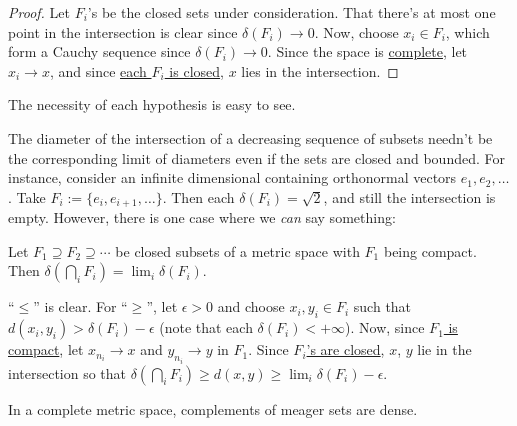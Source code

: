 	\begin{proof}
		Let $F_i$'s be the closed sets under consideration. That there's at most one point in the intersection is clear since \uline{$\delta(F_i)\to 0$}. Now, choose
		$x_i\in F_i$, which form a Cauchy sequence since \uline{$\delta(F_i)\to 0$}. Since the space is \uline{complete}, let $x_i\to x$, and since \uline{each $F_i$ is closed}, $x$ lies in the intersection.
	\end{proof}
	
	\begin{rmk}
		The necessity of each hypothesis is easy to see.
	\end{rmk}
	
	\begin{dgrs}
		The diameter of the intersection of a decreasing sequence of subsets needn't be the corresponding limit of diameters even if the sets are closed and bounded. For instance, consider an infinite dimensional \NLS containing orthonormal vectors $e_1, e_2, \ldots$. Take $F_i := \{e_i, e_{i + 1}, \ldots\}$. Then each $\delta(F_i) = \sqrt 2$, and still the intersection is empty. However, there is one case where we \emph{can} say something:
		
		\begin{prp}
			Let $F_1\supseteq F_2\supseteq\cdots$ be closed subsets of a metric space with $F_1$ being compact. Then $\delta(\bigcap_i F_i) = \lim_i\delta(F_i)$.
		\end{prp}
		
		\begin{dgrsProof}
			``$\le$'' is clear. For ``$\ge$'', let $\epsilon> 0$ and choose $x_i, y_i\in F_i$ such that $d(x_i, y_i) > \delta(F_i) - \epsilon$ (note that each $\delta(F_i) < +\infty$). Now, since \uline{$F_1$ is compact}, let $x_{n_i}\to x$ and $y_{n_i}\to y$ in $F_1$. Since \uline{$F_i$'s are closed}, $x$, $y$ lie in the intersection so that $\delta(\bigcap_i F_i)\ge d(x, y)\ge \lim_i\delta(F_i) - \epsilon$.
		\end{dgrsProof}
	\end{dgrs}
	
	\begin{thm}\label{THM: BCT}
		In a complete metric space, complements of meager sets are dense.
	\end{thm}
	
